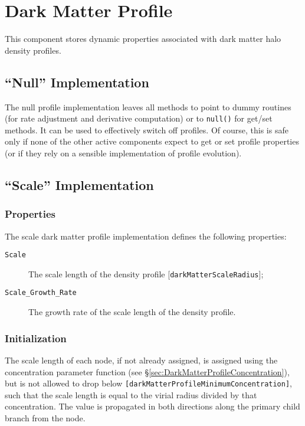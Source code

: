 \section{Dark Matter Profile}

This component stores dynamic properties associated with dark matter halo density profiles.

\subsection{``Null'' Implementation}

The null profile implementation leaves all methods to point to dummy routines (for rate adjustment and derivative computation) or to {\tt null()} for get/set methods. It can be used to effectively switch off profiles. Of course, this is safe only if none of the other active components expect to get or set profile properties (or if they rely on a sensible implementation of profile evolution).

\subsection{``Scale'' Implementation}

\subsubsection{Properties}

The scale dark matter profile implementation defines the following properties:
\begin{description}
 \item [{\tt Scale}] The scale length of the density profile [{\tt darkMatterScaleRadius}];
 \item [{\tt Scale\_Growth\_Rate}] The growth rate of the scale length of the density profile.
\end{description}

\subsubsection{Initialization}

The scale length of each node, if not already assigned, is assigned using the concentration parameter function (see \S\ref{sec:DarkMatterProfileConcentration}), but is not allowed to drop below {\tt [darkMatterProfileMinimumConcentration]}, such that the scale length is equal to the virial radius divided by that concentration. The value is propagated in both directions along the primary child branch from the node.

